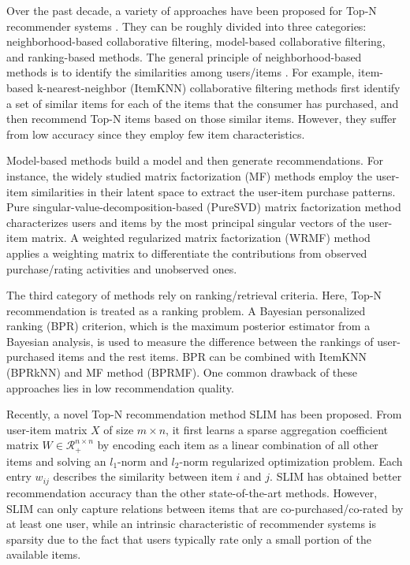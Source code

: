 \documentclass[letterpaper]{article}
\begin{document}
Over the past decade, a variety of approaches have been proposed for Top-N recommender systems \cite{ricci2011introduction}. They can be roughly divided into three categories: %
neighborhood-based collaborative filtering, model-based collaborative filtering, and ranking-based methods. The general principle of neighborhood-based methods is to identify the similarities among users/items \cite{deshpande2004item}. For example, item-based k-nearest-neighbor (ItemKNN) collaborative filtering methods first identify a set of similar items for each of the items that the consumer has purchased, and then recommend Top-N items based on those similar items. However, they suffer from low accuracy since they employ few item characteristics.

Model-based methods build a model and then generate recommendations. For instance, the widely studied matrix factorization (MF) methods employ the user-item similarities in their latent space to extract the user-item purchase patterns. Pure singular-value-decomposition-based (PureSVD) matrix factorization method \cite{cremonesi2010performance} characterizes users and items by the most principal singular vectors of the user-item matrix. A weighted regularized matrix factorization (WRMF) \cite{pan2008one,hu2008collaborative} method applies a weighting matrix to differentiate the contributions from observed purchase/rating activities and unobserved ones.%

The third category of methods rely on ranking/retrieval criteria. Here, Top-N recommendation is treated as a ranking problem. A Bayesian personalized ranking (BPR) \cite{rendle2009bpr} criterion, which is the maximum posterior estimator from a Bayesian analysis, is used to measure the difference between the rankings of user-purchased items and the rest items. BPR can be combined with ItemKNN (BPRkNN) and MF method (BPRMF). One common drawback of these approaches lies in low recommendation quality.

Recently, a novel Top-N recommendation method SLIM \cite{ning2011slim} has been proposed. From user-item matrix $X$ of size $m\times n$, it first learns a sparse aggregation coefficient matrix $W\in\mathcal{R}_{+}^{n\times n}$ by encoding each item as a linear combination of all other items and solving an $l_1$-norm and $l_2$-norm regularized optimization problem. Each entry $w_{ij}$ describes the similarity between item $i$ and $j$. SLIM has obtained better recommendation accuracy than the other state-of-the-art methods. However, SLIM can only capture relations between items that are co-purchased/co-rated by at least one user, while an intrinsic characteristic of recommender systems is sparsity due to the fact that users typically rate only a small portion of the available items. 
\end{document}

